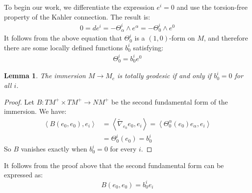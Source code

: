 \documentclass[11pt]{amsart}
\newtheorem{lem}[subsection]{Lemma}
\theoremstyle{definition}
\theoremstyle{definition}
\def \la { \left\langle }
\def \ra { \right\rangle }
\def \nablasquig{ \tilde{\nabla} }
\def \TMp{ TM^{+} }
\def \NMp{ NM^+ }
\def \TMps{ T^{*}M^{+} }
\begin{document}
\bigskip


To begin our work, we differentiate the expression $e^i = 0$ and use the torsion-free property of the Kahler connection.  The result is:
%
\begin{align*}
0 = d e^i = - \Theta^i_{\alpha} \wedge e^{\alpha} = - \Theta^i_0 \wedge e^0
\end{align*}
%
It follows from the above equation that $\Theta^i_0$ is a $(1,0)$-form on $M$, and therefore there are some locally defined functions $b^i_0$ satisfying:
%
\begin{align}
\Theta^i_0 = b^i_0 e^0
\end{align}

\begin{lem} The immersion $M \rightarrow M_c$ is totally geodesic if and only if $b^i_0 = 0$ for all $i$.
\end{lem}

\begin{proof} Let $B : \TMp \times \TMp \rightarrow \NMp$ be the second fundamental form of the immersion.  We have:
%
\begin{align*}
\la B(e_0, e_0), e_i \ra &= \la \nablasquig_{e_0} e_0, e_i \ra = \la \Theta^{\alpha}_0 ( e_0 ) e_{\alpha}, e_i \ra \\
&= \Theta^i_0 (e_0) = b^i_0
\end{align*}
%
So $B$ vanishes exactly when $b^i_0 = 0$ for every $i$.
%
\end{proof}

It follows from the proof above that the second fundamental form can be expressed as:
%
$$B(e_0, e_0) = b^i_0 e_i$$
\end{document}
